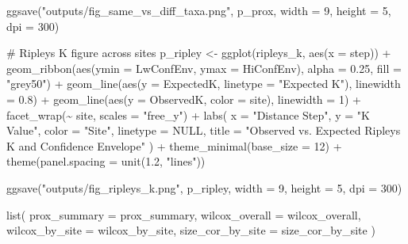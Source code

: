 \documentclass[
  letterpaper,
  DIV=11,
  numbers=noendperiod]{scrartcl}
\newenvironment{Shaded}{\begin{snugshade}}{\end{snugshade}}
\newcommand{\AttributeTok}[1]{\textcolor[rgb]{0.40,0.45,0.13}{#1}}
\newcommand{\CommentTok}[1]{\textcolor[rgb]{0.37,0.37,0.37}{#1}}
\newcommand{\ConstantTok}[1]{\textcolor[rgb]{0.56,0.35,0.01}{#1}}
\newcommand{\DecValTok}[1]{\textcolor[rgb]{0.68,0.00,0.00}{#1}}
\newcommand{\FloatTok}[1]{\textcolor[rgb]{0.68,0.00,0.00}{#1}}
\newcommand{\FunctionTok}[1]{\textcolor[rgb]{0.28,0.35,0.67}{#1}}
\newcommand{\NormalTok}[1]{\textcolor[rgb]{0.00,0.23,0.31}{#1}}
\newcommand{\OtherTok}[1]{\textcolor[rgb]{0.00,0.23,0.31}{#1}}
\newcommand{\SpecialCharTok}[1]{\textcolor[rgb]{0.37,0.37,0.37}{#1}}
\newcommand{\StringTok}[1]{\textcolor[rgb]{0.13,0.47,0.30}{#1}}
\begin{document}
\begin{Shaded}
\begin{Highlighting}[]
\FunctionTok{ggsave}\NormalTok{(}\StringTok{"outputs/fig\_same\_vs\_diff\_taxa.png"}\NormalTok{, p\_prox, }\AttributeTok{width =} \DecValTok{9}\NormalTok{, }\AttributeTok{height =} \DecValTok{5}\NormalTok{, }\AttributeTok{dpi =} \DecValTok{300}\NormalTok{)}

\CommentTok{\# Ripley\textquotesingle{}s K figure across sites}
\NormalTok{p\_ripley }\OtherTok{\textless{}{-}} \FunctionTok{ggplot}\NormalTok{(ripleys\_k, }\FunctionTok{aes}\NormalTok{(}\AttributeTok{x =}\NormalTok{ step)) }\SpecialCharTok{+}
  \FunctionTok{geom\_ribbon}\NormalTok{(}\FunctionTok{aes}\NormalTok{(}\AttributeTok{ymin =}\NormalTok{ LwConfEnv, }\AttributeTok{ymax =}\NormalTok{ HiConfEnv), }\AttributeTok{alpha =} \FloatTok{0.25}\NormalTok{, }\AttributeTok{fill =} \StringTok{"grey50"}\NormalTok{) }\SpecialCharTok{+}
  \FunctionTok{geom\_line}\NormalTok{(}\FunctionTok{aes}\NormalTok{(}\AttributeTok{y =}\NormalTok{ ExpectedK, }\AttributeTok{linetype =} \StringTok{"Expected K"}\NormalTok{), }\AttributeTok{linewidth =} \FloatTok{0.8}\NormalTok{) }\SpecialCharTok{+}
  \FunctionTok{geom\_line}\NormalTok{(}\FunctionTok{aes}\NormalTok{(}\AttributeTok{y =}\NormalTok{ ObservedK, }\AttributeTok{color =}\NormalTok{ site), }\AttributeTok{linewidth =} \DecValTok{1}\NormalTok{) }\SpecialCharTok{+}
  \FunctionTok{facet\_wrap}\NormalTok{(}\SpecialCharTok{\textasciitilde{}}\NormalTok{ site, }\AttributeTok{scales =} \StringTok{"free\_y"}\NormalTok{) }\SpecialCharTok{+}
  \FunctionTok{labs}\NormalTok{(}
    \AttributeTok{x =} \StringTok{"Distance Step"}\NormalTok{,}
    \AttributeTok{y =} \StringTok{"K Value"}\NormalTok{,}
    \AttributeTok{color =} \StringTok{"Site"}\NormalTok{,}
    \AttributeTok{linetype =} \ConstantTok{NULL}\NormalTok{,}
    \AttributeTok{title =} \StringTok{"Observed vs. Expected Ripley\textquotesingle{}s K and Confidence Envelope"}
\NormalTok{  ) }\SpecialCharTok{+}
  \FunctionTok{theme\_minimal}\NormalTok{(}\AttributeTok{base\_size =} \DecValTok{12}\NormalTok{) }\SpecialCharTok{+}
  \FunctionTok{theme}\NormalTok{(}\AttributeTok{panel.spacing =} \FunctionTok{unit}\NormalTok{(}\FloatTok{1.2}\NormalTok{, }\StringTok{"lines"}\NormalTok{))}

\FunctionTok{ggsave}\NormalTok{(}\StringTok{"outputs/fig\_ripleys\_k.png"}\NormalTok{, p\_ripley, }\AttributeTok{width =} \DecValTok{9}\NormalTok{, }\AttributeTok{height =} \DecValTok{5}\NormalTok{, }\AttributeTok{dpi =} \DecValTok{300}\NormalTok{)}

\FunctionTok{list}\NormalTok{(}
  \AttributeTok{prox\_summary =}\NormalTok{ prox\_summary,}
  \AttributeTok{wilcox\_overall =}\NormalTok{ wilcox\_overall,}
  \AttributeTok{wilcox\_by\_site =}\NormalTok{ wilcox\_by\_site,}
  \AttributeTok{size\_cor\_by\_site =}\NormalTok{ size\_cor\_by\_site}
\NormalTok{)}
\end{Highlighting}
\end{Shaded}
\end{document}
